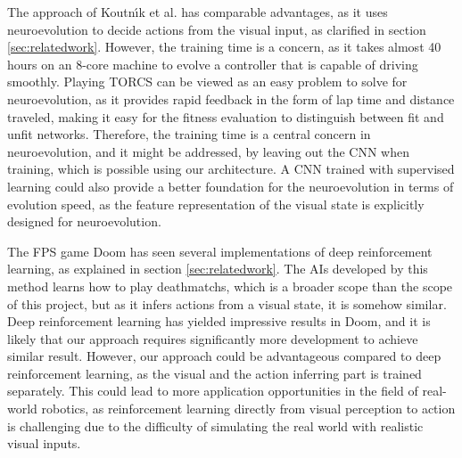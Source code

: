 The approach of Koutn\'{\i}k et al.\cite{torcs} has comparable advantages, as it uses neuroevolution to decide actions from the visual input, as clarified in section \ref{sec:relatedwork}. However, the training time is a concern, as it takes almost 40 hours on an 8-core machine to evolve a controller that is capable of driving smoothly. Playing TORCS can be viewed as an easy problem to solve for neuroevolution, as it provides rapid feedback in the form of lap time and distance traveled, making it easy for the fitness evaluation to distinguish between fit and unfit networks. Therefore, the training time is a central concern in neuroevolution, and it might be addressed, by leaving out the CNN when training, which is possible using our architecture. A CNN trained with supervised learning could also provide a better foundation for the neuroevolution in terms of evolution speed, as the feature representation of the visual state is explicitly designed for neuroevolution.

The FPS game Doom has seen several implementations of deep reinforcement learning, as explained in section \ref{sec:relatedwork}. The AIs developed by this method learns how to play deathmatchs, which is a broader scope than the scope of this project, but as it infers actions from a visual state, it is somehow similar. Deep reinforcement learning has yielded impressive results in Doom, and it is likely that our approach requires significantly more development to achieve similar result. However, our approach could be advantageous compared to deep reinforcement learning, as the visual and the action inferring part is trained separately. This could lead to more application opportunities in the field of real-world robotics, as reinforcement learning directly from visual perception to action is challenging due to the difficulty of simulating the real world with realistic visual inputs.

